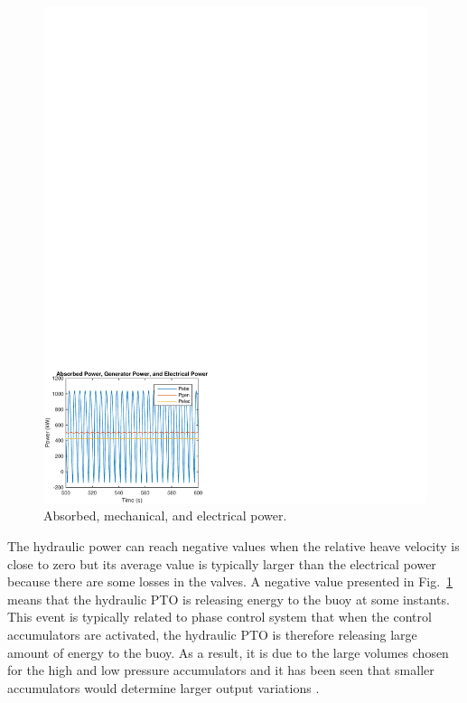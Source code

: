 \documentclass[twocolumn,10pt]{asme2e}
\begin{document}
\begin{figure}[t]
    \centering
    \includegraphics[width=1\columnwidth]{Images/HYDPower}
    \caption{Absorbed, mechanical, and electrical power. }
    \label{HydP}
    \end{figure}

The hydraulic power can reach negative values when the relative heave velocity is close to zero but its  average value is typically larger than the electrical power because there are some losses in the valves. A negative value presented in Fig.~\ref{HydP} means that the hydraulic PTO is releasing energy to the buoy at some instants. This event is typically related to phase control system that when the control accumulators are activated, the hydraulic PTO is therefore releasing large amount of energy to the buoy. As a result, it is due to the large volumes chosen for the high and low pressure accumulators and it has been seen that smaller accumulators would determine larger output variations \cite{yukio2014modeling}.
\end{document}
